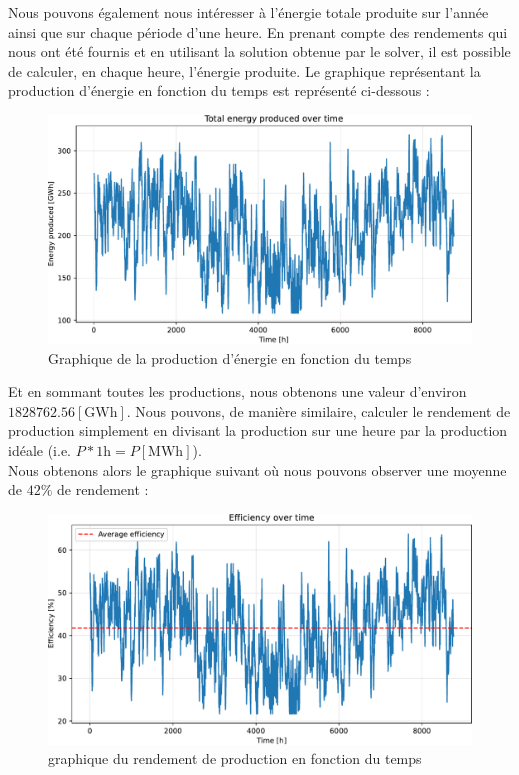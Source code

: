 \documentclass{article}
\newlength{\temp}
\begin{document}
Nous pouvons également nous intéresser à l'énergie totale produite sur l'année ainsi que sur chaque période d'une heure.
En prenant compte des rendements qui nous ont été fournis et en utilisant la solution obtenue par le solver,
il est possible de calculer, en chaque heure, l'énergie produite. Le graphique représentant la production d'énergie en fonction du temps est représenté ci-dessous :

\begin{figure}[h!]
    \centering
    \includegraphics[scale=0.5]{Images/Partie_1/Q1/energy_produced.pdf}
    \caption{Graphique de la production d'énergie en fonction du temps}
    \label{fig:energy_produced_partie1}
\end{figure}
Et en sommant toutes les productions, nous obtenons une valeur d'environ $1828762.56 [\mathrm{GWh}]$. 
\newpage
Nous pouvons, de manière similaire, calculer le rendement de production simplement en divisant la production sur une heure par la production idéale (i.e. $P*1\mathrm{h} = P [\mathrm{MWh}]$).\\
Nous obtenons alors le graphique suivant où nous pouvons observer une moyenne de $42\%$ de rendement :

\begin{figure}[h!]
    \centering
    \includegraphics[scale=0.5]{Images/Partie_1/Q1/efficiency.pdf}
    \caption{graphique du rendement de production en fonction du temps}
    \label{fig:efficiency_partie1}
\end{figure}
\end{document}
